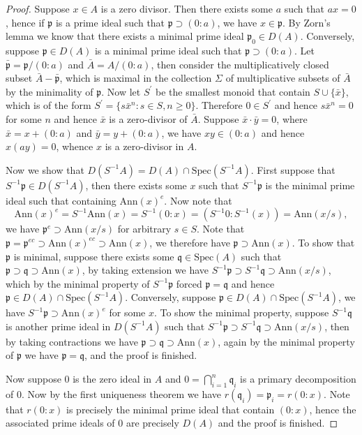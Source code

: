 \begin{proof}
Suppose $x\in A$ is a zero divisor. Then there exists some $a$ such that $ax=0$, hence if $\mathfrak{p}$ is a prime ideal such that $\mathfrak{p}\supset(0:a)$, we have $x\in\mathfrak{p}$. By Zorn's lemma we know that there exists a minimal prime ideal $\mathfrak{p}_0\in D(A)$. Conversely, suppose $\mathfrak{p}\in D(A)$ is a minimal prime ideal such that $\mathfrak{p}\supset (0:a)$. Let $\bar{\mathfrak{p}}=\mathfrak{p}/(0:a)$ and $\bar{A}=A/(0:a)$, then consider the multiplicatively closed subset $\bar{A}-\bar{\mathfrak{p}}$, which is maximal in the collection $\Sigma$ of multiplicative subsets of $\bar{A}$ by the minimality of $\mathfrak{p}$. Now let $S^\prime$ be the smallest monoid that contain $S\cup\{\bar{x}\}$, which is of the form $S^\prime=\{s\bar{x}^n:s\in S,n\ge 0\}$. Therefore $0\in S^\prime$ and hence $s\bar{x}^n=0$ for some $n$ and hence $\bar{x}$ is a zero-divisor of $\bar{A}$. Suppose $\bar{x}\cdot\bar{y}=0$, where $\bar{x}=x+(0:a)$ and $\bar{y}=y+(0:a)$, we have $xy\in (0:a)$ and hence $x(ay)=0$, whence $x$ is a zero-divisor in $A$.\par
Now we show that $D\left( S^{-1}A \right) =D\left( A \right) \cap \mathrm{Spec}\left( S^{-1}A \right) $. First suppose that $S^{-1}\mathfrak{p}\in D(S^{-1}A)$, then there exists some $x$ such that $S^{-1}\mathfrak{p}$ is the minimal prime ideal such that containing $\mathrm{Ann}(x)^e$. Now note that 
$$
\mathrm{Ann}\left( x \right) ^e=S^{-1}\mathrm{Ann}\left( x \right) =S^{-1}\left( 0:x \right) =\left( S^{-1}0:S^{-1}\left( x \right) \right) =\mathrm{Ann}\left( x/s \right) ,
$$
we have $\mathfrak{p}^e\supset\mathrm{Ann}(x/s)$ for arbitrary $s\in S$. Note that $\mathfrak{p} =\mathfrak{p} ^{ec}\supset \mathrm{Ann}\left( x \right) ^{ec}\supset \mathrm{Ann}\left( x \right) $, we therefore have $\mathfrak{p}\supset\mathrm{Ann}(x)$. To show that $\mathfrak{p}$ is minimal, suppose there exists some $\mathfrak{q}\in\mathrm{Spec}(A)$ such that $\mathfrak{p}\supset\mathfrak{q}\supset\mathrm{Ann}(x)$, by taking extension we have $S^{-1}\mathfrak{p} \supset S^{-1}\mathfrak{q} \supset \mathrm{Ann}\left( x/s \right) $, which by the minimal property of $S^{-1}\mathfrak{p}$ forced $\mathfrak{p}=\mathfrak{q}$ and hence $\mathfrak{p}\in D(A)\cap\mathrm{Spec}(S^{-1}A)$. Conversely, suppose $\mathfrak{p}\in D(A)\cap\mathrm{Spec}(S^{-1}A)$, we have $S^{-1}\mathfrak{p}\supset\mathrm{Ann}(x)^e$ for some $x$. To show the minimal property, suppose $S^{-1}\mathfrak{q}$ is another prime ideal in $D(S^{-1}A)$ such that $S^{-1}\mathfrak{p} \supset S^{-1}\mathfrak{q} \supset \mathrm{Ann}\left( x/s \right) $, then by taking contractions we have $\mathfrak{p}\supset\mathfrak{q}\supset\mathrm{Ann}(x)$, again by the minimal property of $\mathfrak{p}$ we have $\mathfrak{p}=\mathfrak{q}$, and the proof is finished.\par
Now suppose $0$ is the zero ideal in $A$ and $0=\bigcap_{i=1}^n\mathfrak{q}_i$ is a primary decomposition of $0$. Now by the first uniqueness theorem we have $r(\mathfrak{q}_i)=\mathfrak{p}_i=r(0:x)$. Note that $r(0:x)$ is precisely the minimal prime ideal that contain $(0:x)$, hence the associated prime ideals of $0$ are precisely $D(A)$ and the proof is finished.
\end{proof}
